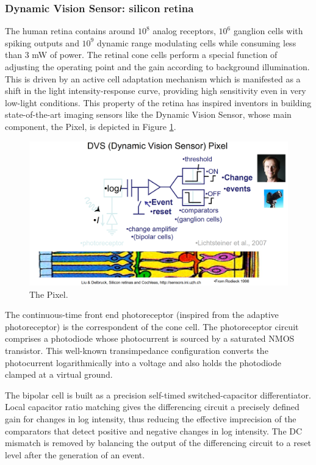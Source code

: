 \documentclass[main]{subfiles}
\begin{document}
\subsubsection{Dynamic Vision Sensor: silicon retina}
The human retina contains around $10^8$ analog receptors, $10^6$ ganglion cells with spiking outputs and $10^9$ dynamic range modulating cells while consuming less than 3 mW of power. The retinal cone cells perform a special function of adjusting the operating point and the gain according to background illumination. This is driven by an active cell adaptation mechanism which is manifested as a shift in the light intensity-response curve, providing high sensitivity even in very low-light conditions. This property of the retina has inspired inventors in building state-of-the-art imaging sensors like the Dynamic Vision Sensor, whose main component, the Pixel, is depicted in Figure \ref{fig:dvs}.
%
\begin{figure}[h]
    \centering
    \includegraphics[width=0.8\linewidth]{11_NeuromorphicSystems1/figures/DVS.PNG}
    \caption{The Pixel.}
    \label{fig:dvs}
\end{figure}
%

The continuous-time front end photoreceptor (inspired from the adaptive photoreceptor) is the correspondent of the cone cell. The  photoreceptor  circuit  comprises  a  photodiode  whose photocurrent is sourced by a saturated NMOS transistor. This  well-known  transimpedance  configuration converts the photocurrent logarithmically into a voltage and also holds the photodiode clamped at a virtual ground. 


The bipolar cell is built as a precision self-timed switched-capacitor differentiator. Local capacitor ratio matching gives the differencing circuit a precisely defined gain for changes in log intensity, thus reducing the effective imprecision of the comparators that detect positive and negative changes in log intensity. The DC mismatch is removed by balancing the output of the differencing circuit to a reset level after the generation of an event. 
\end{document}

